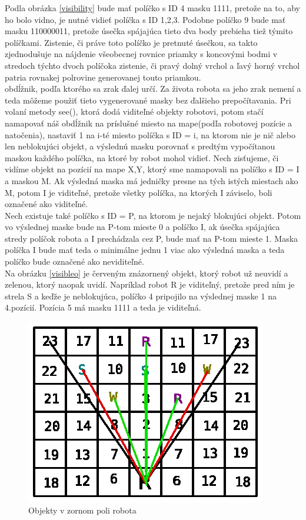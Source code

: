 Podla obrázka \ref{visibility} bude mať políčko s ID 4 masku 1111, pretože na to, aby ho bolo vidno, je nutné vidieť políčka s ID 1,2,3. Podobne políčko 9 bude mať masku 110000011, pretože úsečka spájajúca tieto dva body prebieha tiež týmito políčkami. Zistenie, či práve toto políčko je pretnuté úsečkou, sa takto zjednodušuje na nájdenie všeobecnej rovnice priamky s koncovými bodmi v stredoch týchto dvoch políčoka zistenie, či pravý dolný vrchol a ľavý horný vrchol patria rovnakej polrovine generovanej touto priamkou.\\
obdĺžnik, podľa ktorého sa zrak ďalej určí.
Za života robota sa jeho zrak nemení a teda môžeme použiť tieto vygenerované masky bez ďalšieho prepočítavania. Pri volaní metody see(), ktorá dodá viditeľné objekty robotovi, potom stačí namapovať náš obdĺžnik na príslušné miesto na mape(podľa robotovej pozície a natočenia), nastaviť 1 na i-té miesto políčka s ID = i, na ktorom nie je nič alebo len neblokujúci objekt, a výslednú masku porovnať s predtým vypočítanou maskou každého políčka, na ktoré by robot mohol vidieť. Nech zisťujeme, či vidíme objekt na pozícií na mape X,Y, ktorý sme namapovali na políčko s ID = I a maskou M. Ak výsledná maska má jedničky presne na tých istých miestach ako M, potom I je viditeľné, pretože všetky políčka, na ktorých I záviselo, boli označené ako viditeľné. \\
Nech existuje také políčko s ID = P, na ktorom je nejaký blokujúci objekt. Potom vo výslednej maske bude na P-tom mieste 0 a políčko I, ak úsečka spájajúca stredy políčok robota a I prechádzala cez P, bude mať na P-tom mieste 1. Maska políčka I bude mať teda o minimálne jednu 1 viac ako výsledná maska a teda políčko bude označené ako neviditeľné.\\
Na obrázku \ref{visibleo} je červeným znázornený objekt, ktorý robot už neuvidí a zelenou, ktorý naopak uvidí. Napríklad robot R je viditeľný, pretože pred ním je strela S a keďže je neblokujúca, políčko 4 pripojilo na výslednej maske 1 na 4.pozícií. Pozícia 5 má masku 1111 a teda je viditeľná.
\begin{figure}
\centering
\includegraphics[totalheight=0.4\textheight,width=.8\textwidth]{VisibleObjects}
\caption { Objekty v zornom poli robota}
\label{fig:visibleo}
\end{figure}
